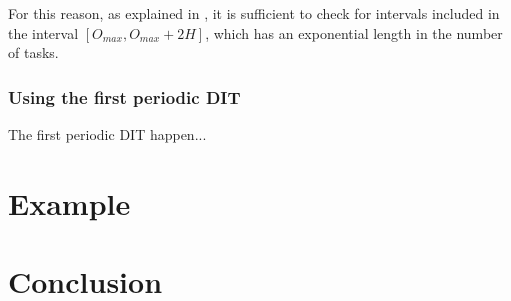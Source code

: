 \documentclass[times, 10pt,twocolumn, a4paper]{article}
\begin{document}
For this reason, as explained in \cite{leung1982complexity}, it is sufficient to check for intervals included in the interval $[O_{max}, O_{max} + 2H]$, which has an exponential length in the number of tasks.

\subsubsection{Using the first periodic DIT}

The first periodic DIT happen...

\section{Example}

\section{Conclusion}

\nocite{*}


\end{document}
